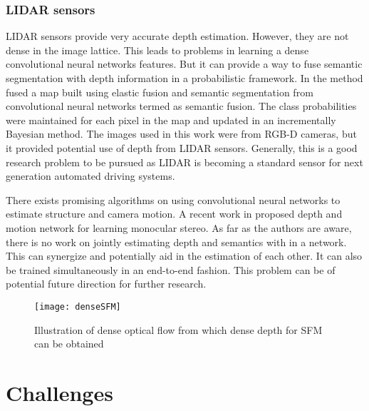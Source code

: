 \documentclass[conference]{IEEEtran}
\begin{document}
\subsubsection{LIDAR sensors}

LIDAR sensors provide very accurate depth estimation. However, they are not dense in the image lattice. This leads to problems in learning a dense convolutional neural networks features. But it can provide a way to fuse semantic segmentation with depth information in a probabilistic framework. In \cite{mccormac2016semanticfusion} the method fused a map built using elastic fusion \cite{whelan2015elasticfusion} and semantic segmentation from convolutional neural networks termed as semantic fusion. The class probabilities were maintained for each pixel in the map and updated in an incrementally Bayesian method. The images used in this work were from RGB-D cameras, but it provided potential use of depth from LIDAR sensors. Generally, this is a good research problem to be pursued as LIDAR is becoming a standard sensor for next generation automated driving systems. 

There exists promising algorithms on using convolutional neural networks to estimate structure and camera motion. A recent work in \cite{ummenhofer2016demon} proposed depth and motion network for learning monocular stereo. As far as the authors are aware, there is no work on jointly estimating depth and semantics with in a network. This can synergize and potentially aid in the estimation of each other. It can also be trained simultaneously in an end-to-end fashion. This problem can be of potential future direction for further research.

\begin{figure}[!t]
\centering
\texttt{[image: denseSFM]}
\caption{Illustration of dense optical flow from which dense depth for SFM can be obtained}
\label{fig:denseSFM}
\end{figure}

\section{Challenges}\label{sec:chall}
\end{document}

